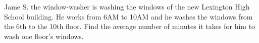 Jame S. the window-washer is washing the windows of the new Lexington High School building. He works from 6AM to 10AM and he washes the windows from the 6th to the 10th floor. Find the average number of minutes it takes for him to wash one floor's windows.
